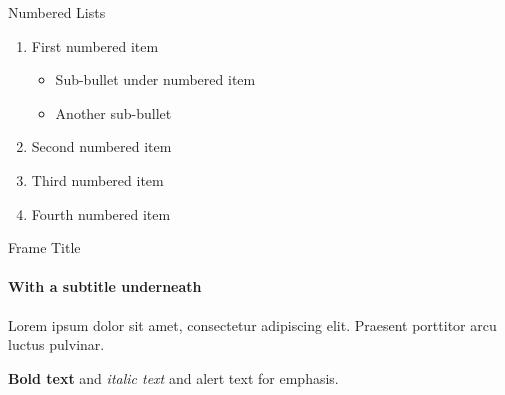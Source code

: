 \documentclass[aspectratio=169]{beamer}
\begin{document}

\begin{frame}{Numbered Lists}
  
  \begin{enumerate}
    \item First numbered item
      \begin{itemize}
        \item Sub-bullet under numbered item
        \item Another sub-bullet
      \end{itemize}
    \item Second numbered item
    \item Third numbered item
    \item Fourth numbered item
  \end{enumerate}
  
\end{frame}


\begin{frame}{Frame Title}
  \framesubtitle{With a subtitle underneath}
  
  Lorem ipsum dolor sit amet, consectetur adipiscing elit. Praesent 
  porttitor arcu luctus pulvinar.
  
  \vspace{1em}
  
  \textbf{Bold text} and \textit{italic text} and \alert{alert text} 
  for emphasis.
  
\end{frame}

\end{document}
